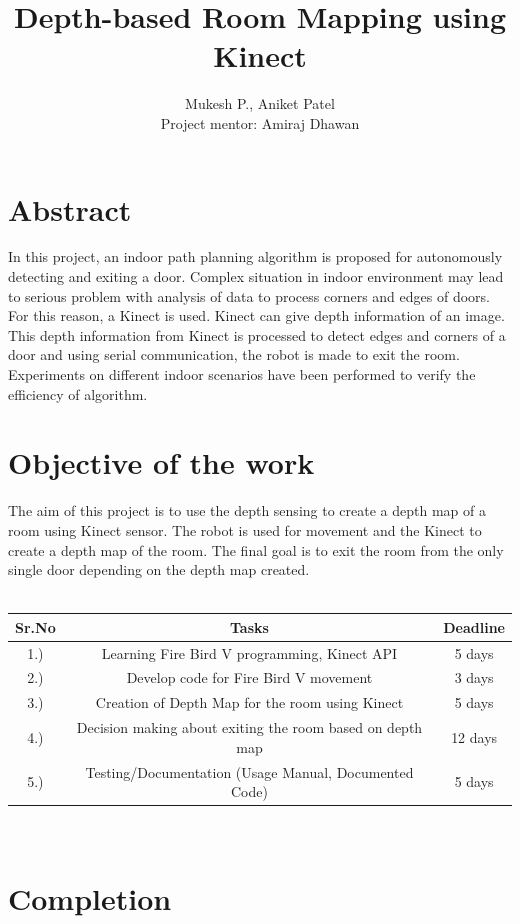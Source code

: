 \documentclass{report}
\author{Mukesh P., Aniket Patel \\ Project mentor: Amiraj Dhawan}
\title{Depth-based Room Mapping using Kinect}
\begin{document}
\maketitle
\tableofcontents


\chapter{Abstract}
In this project, an indoor path planning algorithm is proposed for autonomously detecting and exiting a door. Complex situation in indoor
environment may lead to serious problem with analysis of data to process corners and edges of doors. For this reason, a Kinect is used.
Kinect can give depth information of an image. This depth information from Kinect is processed to detect edges and corners of a door and using serial
communication, the robot is made to exit the room. Experiments on different indoor scenarios have been performed
to verify the efficiency of algorithm.
\chapter{Objective of the work}
The aim of this project is to use the depth sensing to create a depth map of a room using Kinect sensor. The robot is used for movement and the 
Kinect to create a depth map of the room. The final goal is to exit the room from the only single door depending on the depth map created. \\ \\

\begin{tabular}{ | c | c | c |}
	\hline\hline
	\bf Sr.No & \bf Tasks & \bf Deadline \\ 
	\hline
	1.) & Learning Fire Bird V programming, Kinect API & 5 days \\
	\hline
	2.) & Develop code for Fire Bird V movement & 3 days \\
	\hline
	3.) & Creation of Depth Map for the room using Kinect & 5 days \\
	\hline
	4.) & Decision making about exiting the room based on depth map & 12 days\\
	\hline
	5.) & Testing/Documentation (Usage Manual, Documented Code) & 5 days
	\\ \hline

\end{tabular} \\

\chapter{Completion}
\end{document}

